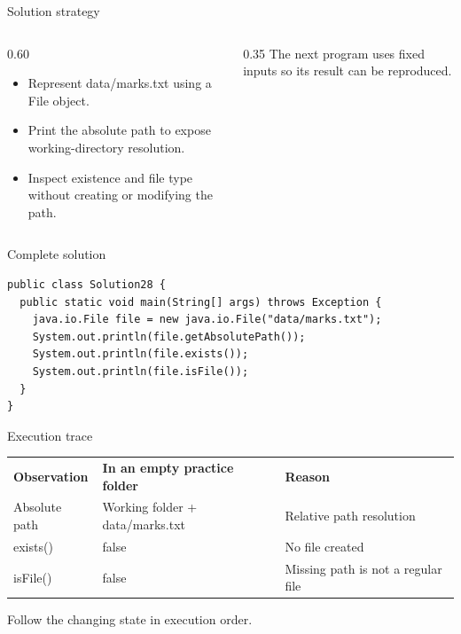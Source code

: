 \documentclass[10pt,aspectratio=169]{beamer}
\begin{document}
\begin{frame}[fragile,t]{Solution strategy}
\begin{columns}[T,onlytextwidth]\begin{column}{0.60\textwidth}
\begin{itemize}
\item Represent data/marks.txt using a File object.
\item Print the absolute path to expose working-directory resolution.
\item Inspect existence and file type without creating or modifying the path.
\end{itemize}
\end{column}\begin{column}{0.35\textwidth}\small
The next program uses fixed inputs so its result can be reproduced.
\end{column}\end{columns}
\end{frame}

\begin{frame}[fragile,t]{Complete solution}
\begin{lstlisting}
public class Solution28 {
  public static void main(String[] args) throws Exception {
    java.io.File file = new java.io.File("data/marks.txt");
    System.out.println(file.getAbsolutePath());
    System.out.println(file.exists());
    System.out.println(file.isFile());
  }
}
\end{lstlisting}
\end{frame}

\begin{frame}[fragile,t]{Execution trace}
\small\renewcommand{\arraystretch}{1.5}
\begin{tabularx}{\textwidth}{>{\raggedright\arraybackslash}X>{\raggedright\arraybackslash}X>{\raggedright\arraybackslash}X}
\rowcolor{navy}
\color{white}\bfseries Observation & \color{white}\bfseries In an empty practice folder & \color{white}\bfseries Reason\\
Absolute path & Working folder + data/marks.txt & Relative path resolution\\
exists() & false & No file created\\
isFile() & false & Missing path is not a regular file\\
\end{tabularx}
\vspace{3mm}\footnotesize Follow the changing state in execution order.
\end{frame}
\end{document}
